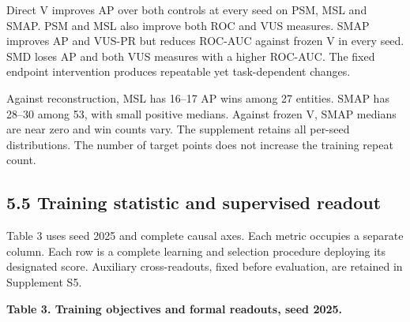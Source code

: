 \documentclass[
  english,
  10pt,
]{article}
\begin{document}
Direct V improves AP over both controls at every seed on PSM, MSL and
SMAP. PSM and MSL also improve both ROC and VUS measures. SMAP improves
AP and VUS-PR but reduces ROC-AUC against frozen V in every seed. SMD
loses AP and both VUS measures with a higher ROC-AUC. The fixed endpoint
intervention produces repeatable yet task-dependent changes.

Against reconstruction, MSL has 16--17 AP wins among 27 entities. SMAP
has 28--30 among 53, with small positive medians. Against frozen V, SMAP
medians are near zero and win counts vary. The supplement retains all
per-seed distributions. The number of target points does not increase
the training repeat count.

\subsection{5.5 Training statistic and supervised
readout}\label{training-statistic-and-supervised-readout}

Table 3 uses seed 2025 and complete causal axes. Each metric occupies a
separate column. Each row is a complete learning and selection procedure
deploying its designated score. Auxiliary cross-readouts, fixed before
evaluation, are retained in Supplement S5.

\textbf{Table 3. Training objectives and formal readouts, seed 2025.}
\end{document}
